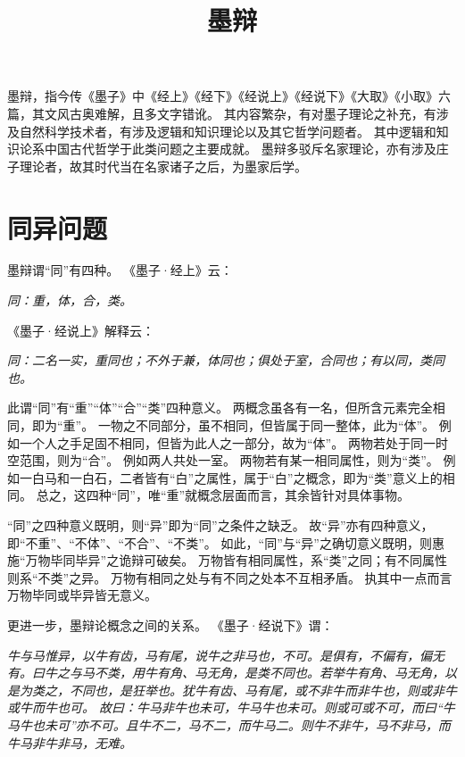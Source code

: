 \documentclass[11pt]{article}
\title{墨辩}
\date{}
\begin{document}
  \maketitle
  
  \newpage
  \linenumbers

墨辩，指今传《墨子》中《经上》《经下》《经说上》《经说下》《大取》《小取》六篇，其文风古奥难解，且多文字错讹。
其内容繁杂，有对墨子理论之补充，有涉及自然科学技术者，有涉及逻辑和知识理论以及其它哲学问题者。
其中逻辑和知识论系中国古代哲学于此类问题之主要成就。
\newline
墨辩多驳斥名家理论，亦有涉及庄子理论者，故其时代当在名家诸子之后，为墨家后学。

\section{同异问题}
墨辩谓“同”有四种。
《墨子·经上》云：

\textit{同：重，体，合，类。}

《墨子·经说上》解释云：

\textit{同：二名一实，重同也；不外于兼，体同也；俱处于室，合同也；有以同，类同也。}

此谓“同”有“重”“体”“合”“类”四种意义。
两概念虽各有一名，但所含元素完全相同，即为“重”。
一物之不同部分，虽不相同，但皆属于同一整体，此为“体”。
例如一个人之手足固不相同，但皆为此人之一部分，故为“体”。
两物若处于同一时空范围，则为“合”。
例如两人共处一室。
两物若有某一相同属性，则为“类”。
例如一白马和一白石，二者皆有“白”之属性，属于“白”之概念，即为“类”意义上的相同。
总之，这四种“同”，唯“重”就概念层面而言，其余皆针对具体事物。

\newline

“同”之四种意义既明，则“异”即为“同”之条件之缺乏。
故“异”亦有四种意义，即“不重”、“不体”、“不合”、“不类”。
如此，“同”与“异”之确切意义既明，则惠施“万物毕同毕异”之诡辩可破矣。
万物皆有相同属性，系“类”之同；有不同属性则系“不类”之异。
万物有相同之处与有不同之处本不互相矛盾。
执其中一点而言万物毕同或毕异皆无意义。

\newline

更进一步，墨辩论概念之间的关系。
《墨子·经说下》谓：

\textit{牛与马惟异，以牛有齿，马有尾，说牛之非马也，不可。是俱有，不偏有，偏无有。曰牛之与马不类，用牛有角、马无角，是类不同也。若举牛有角、马无角，以是为类之，不同也，是狂举也。犹牛有齿、马有尾，或不非牛而非牛也，则或非牛或牛而牛也可。
故曰：牛马非牛也未可，牛马牛也未可。则或可或不可，而曰“牛马牛也未可”亦不可。且牛不二，马不二，而牛马二。则牛不非牛，马不非马，而牛马非牛非马，无难。}
\end{document}
